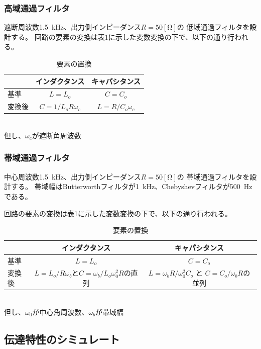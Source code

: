 \documentclass[10pt,a4j,dvipdfmx]{jsarticle}
\makeatletter
\let\@oldsubsec\subsection
\renewcommand{\subsection}[1]{\vspace{-7pt}\@oldsubsec{#1}}
\makeatother
\begin{document}
\subsubsection{高域通過フィルタ}
遮断周波数\SI{1.5}{\kilo\hertz}、出力側インピーダンス$R = 50[\si{\ohm}]$の
低域通過フィルタを設計する。
回路の要素の変換は表1に示した変数変換の下で、以下の通り行われる。

\begin{table}[htb]
  \begin{center}
    \caption{要素の置換}
    \begin{tabular}{|l||c|c|} \hline
       & インダクタンス & キャパシタンス\\ \hline \hline
      基準 & $L=L_o$ & $C=C_o$ \\
      変換後 & $C=1/L_oR\omega_c$ & $L=R/C_o\omega_c$ \\ \hline
    \end{tabular}
    \\ 但し、$\omega_c$が遮断角周波数
  \end{center}
\end{table}

\subsubsection{帯域通過フィルタ}
中心周波数\SI{1.5}{\kilo\hertz}、出力側インピーダンス$R = 50[\si{\ohm}]$の
帯域通過フィルタを設計する。
帯域幅はButterworthフィルタが\SI{1}{\kilo\hertz}、Chebyshevフィルタが\SI{500}{\hertz}である。

回路の要素の変換は表1に示した変数変換の下で、以下の通り行われる。

\begin{table}[htb]
  \begin{center}
    \caption{要素の置換}
    \begin{tabular}{|l||c|c|} \hline
       & インダクタンス & キャパシタンス\\ \hline \hline
      基準 & $L=L_o$ & $C=C_o$ \\
      変換後 & $L=L_o/R\omega_b$と$C=\omega_b/L_o\omega_0^2R$の直列 & $L=\omega_bR/\omega_0^2C_o$ と $C=C_o/\omega_bR$の並列 \\ \hline
    \end{tabular}
    \\ 但し、$\omega_0$が中心角周波数、$\omega_b$が帯域幅
  \end{center}
\end{table}

\subsection{伝達特性のシミュレート}
\end{document}
